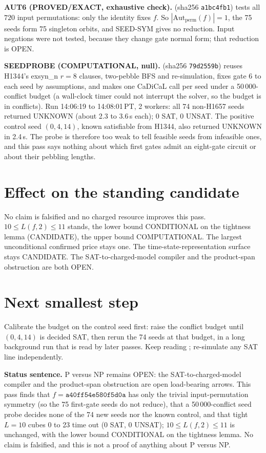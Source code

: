 \documentclass[11pt]{article}
\begin{document}
\textbf{AUT6 (PROVED/EXACT, exhaustive check).}  (sha256 \texttt{a1bc4fb1}) tests all $720$ input permutations: only the identity fixes $f$. So $|\mathrm{Aut}_{\mathrm{perm}}(f)|=1$, the 75 seeds form 75 singleton orbits, and SEED-SYM gives no reduction. Input negations were not tested, because they change gate normal form; that reduction is OPEN.

\textbf{SEEDPROBE (COMPUTATIONAL, null).}  (sha256 \texttt{79d2559b}) reuses H1344's exsyn\_n $r=8$ clauses, two-pebble BFS and re-simulation, fixes gate 6 to each seed by assumptions, and makes one CaDiCaL call per seed under a 50\,000-conflict budget (a wall-clock timer could not interrupt the solver, so the budget is in conflicts). Run 14:06:19 to 14:08:01\,PT, 2 workers: all 74 non-H1657 seeds returned UNKNOWN (about 2.3 to 3.6\,s each); 0 SAT, 0 UNSAT. The positive control seed $(0,4,14)$, known satisfiable from H1344, also returned UNKNOWN in 2.4\,s. The probe is therefore too weak to tell feasible seeds from infeasible ones, and this pass says nothing about which first gates admit an eight-gate circuit or about their pebbling lengths.

\section*{Effect on the standing candidate}
No claim is falsified and no charged resource improves this pass. $10\le L(f,2)\le 11$ stands, the lower bound CONDITIONAL on the tightness lemma (CANDIDATE), the upper bound COMPUTATIONAL. The largest unconditional confirmed price stays one. The time-state-representation surface stays CANDIDATE. The SAT-to-charged-model compiler and the product-span obstruction are both OPEN.

\section*{Next smallest step}
Calibrate the budget on the control seed first: raise the conflict budget until $(0,4,14)$ is decided SAT, then rerun the 74 seeds at that budget, in a long background run that is read by later passes. Keep reading ; re-simulate any SAT line independently.

\bigskip
\noindent\textbf{Status sentence.} P versus NP remains OPEN: the SAT-to-charged-model compiler and the product-span obstruction are open load-bearing arrows. This pass finds that $f=\texttt{a40ff54e580f5d0a}$ has only the trivial input-permutation symmetry (so the 75 first-gate seeds do not reduce), that a 50\,000-conflict seed probe decides none of the 74 new seeds nor the known control, and that tight $L=10$ cubes 0 to 23 time out (0 SAT, 0 UNSAT); $10\le L(f,2)\le 11$ is unchanged, with the lower bound CONDITIONAL on the tightness lemma. No claim is falsified, and this is not a proof of anything about P versus NP.
\end{document}

